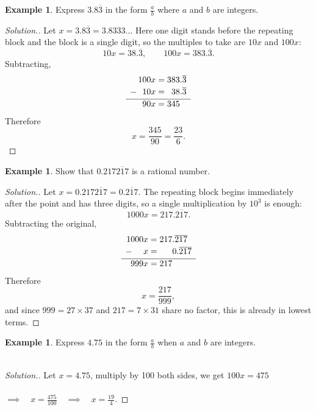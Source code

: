 \documentclass[11pt,a4paper]{article}
\theoremstyle{definition}
\newtheorem{example}[thm]{Example}
\newenvironment{solution}
  {\renewcommand{\qedsymbol}{}\begin{proof}[\textit{Solution}.]}
  {\end{proof}}
\begin{document}
\begin{example}
Express $3.8\overline{3}$ in the form $\frac{a}{b}$ where $a$ and $b$ are integers.
\end{example}

\begin{solution}
Let $x=3.8\overline{3}=3.8333\ldots$ Here one digit stands before the repeating
block and the block is a single digit, so the multiples to take are $10x$ and
$100x$:
$$10x=38.\overline{3},\qquad 100x=383.\overline{3}.$$
Subtracting,
$$\begin{array}{r@{\;}c@{\;}l}
100x & = & 383.\overline{3}\\[2pt]
-\ \ 10x & = & \phantom{0}38.\overline{3}\\[2pt]
\hline
90x & = & 345
\end{array}$$
Therefore
$$x=\frac{345}{90}=\frac{23}{6}.$$
\end{solution}

\begin{example}
Show that $0.217\overline{217}$ is a rational number.
\end{example}

\begin{solution}
Let $x=0.217\overline{217}=0.\overline{217}$. The repeating block begins
immediately after the point and has three digits, so a single multiplication by
$10^{3}$ is enough:
$$1000x=217.\overline{217}.$$
Subtracting the original,
$$\begin{array}{r@{\;}c@{\;}l}
1000x & = & 217.\overline{217}\\[2pt]
-\ \ \ \ x & = & \phantom{000}0.\overline{217}\\[2pt]
\hline
999x & = & 217
\end{array}$$
Therefore
$$x=\frac{217}{999},$$
and since $999=27\times37$ and $217=7\times31$ share no factor, this is already
in lowest terms.
\end{solution}

\begin{example}
Express $4.75$ in the form $\frac{a}{b}$ when $a$ and $b$ are integers.\\\\

\pagebreak
\end{example}

\begin{solution}
Let $x=4.75$, multiply by 100 both sides, we get $100x=475$\\\\   
$\implies \quad  x=\frac{475}{100}\quad  \implies \quad  x=\frac{19}{4}$.
\end{solution}
\end{document}
